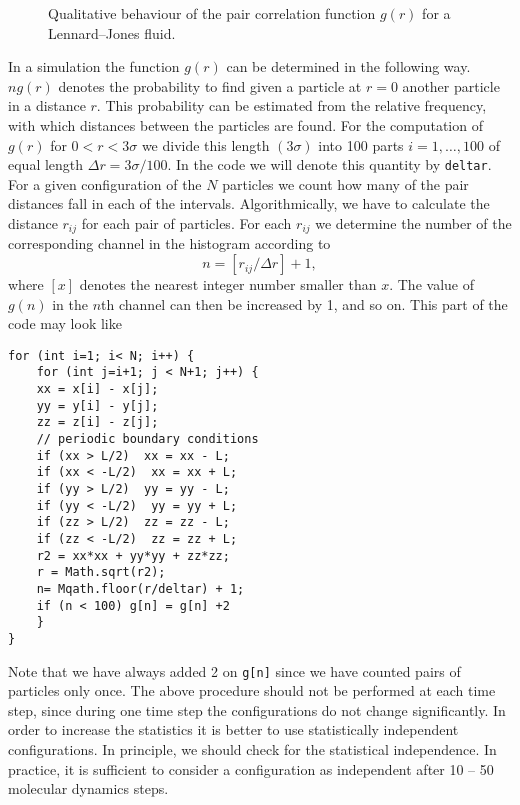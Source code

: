 \begin{figure}[htbp]
  \begin{center}
    
\caption{Qualitative behaviour of the pair correlation function $g(r)$ for 
         a Lennard--Jones fluid.}
    \label{Fig:QualitativePair}
  \end{center}
\end{figure}

In a simulation the function $g(r)$ can be determined in the following way.
$ng(r)$ denotes the probability to find given a particle at $r=0$ 
another particle in a distance $r$. This probability can be estimated from the
relative frequency, with which distances between the particles are found. For
the computation of $g(r)$ for $0< r < 3\sigma$ we divide this length 
$(3\sigma)$ into 100 parts $i=1,\ldots,100$ of equal length 
$\Delta r = 3 \sigma/100$. In the code we will denote this quantity by 
\verb|deltar|. For a given configuration of the $N$ particles we count how
many of the pair distances fall in each of the intervals. Algorithmically, we
have to calculate the distance $r_{ij}$ for each pair of particles. For each
$r_{ij}$ we determine the number of the corresponding channel in the histogram
according to
\begin{displaymath}
n = [r_{ij}/\Delta r] +1,
\end{displaymath}
where $[x]$ denotes the nearest integer number smaller than $x$. The value of
$g(n)$ in the $n$th channel can then be increased by 1, and so on.
This part of the code may look like
\begin{verbatim}
for (int i=1; i< N; i++) {
    for (int j=i+1; j < N+1; j++) {
    xx = x[i] - x[j];
    yy = y[i] - y[j];
    zz = z[i] - z[j];
    // periodic boundary conditions
    if (xx > L/2)  xx = xx - L;
    if (xx < -L/2)  xx = xx + L;
    if (yy > L/2)  yy = yy - L;
    if (yy < -L/2)  yy = yy + L;
    if (zz > L/2)  zz = zz - L;
    if (zz < -L/2)  zz = zz + L;
    r2 = xx*xx + yy*yy + zz*zz;
    r = Math.sqrt(r2);
    n= Mqath.floor(r/deltar) + 1;
    if (n < 100) g[n] = g[n] +2 
    }
}
\end{verbatim}
Note that we have always added 2 on \verb|g[n]| since we have counted pairs of
particles only once. The above procedure should not be performed at each time
step, since during one time step the configurations do not change
significantly. In order to increase the statistics it is better to use
statistically independent configurations. In principle, we should check for
the statistical independence. In practice, it is sufficient to consider a
configuration as independent after 10 -- 50 molecular dynamics steps.


